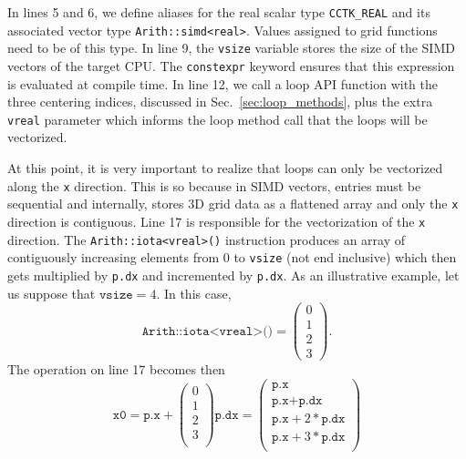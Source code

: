 In lines 5 and 6, we define aliases for the real scalar type \texttt{CCTK\_REAL} and its associated vector type \texttt{Arith::simd<real>}. Values assigned to grid functions need to be of this type. In line 9, the \texttt{vsize} variable stores the size of the SIMD vectors of the target CPU. The \texttt{constexpr} keyword ensures that this expression is evaluated at compile time. In line 12, we call a loop API function with the three centering indices, discussed in Sec.~\ref{sec:loop_methods}, plus the extra \texttt{vreal} parameter which informs the loop method call that the loops will be vectorized.

At this point, it is very important to realize that loops can only be vectorized along the \texttt{x} direction. This is so because in SIMD vectors, entries must be sequential and internally, \CarpetX stores 3D grid data as a flattened array and only the \texttt{x} direction is contiguous. Line 17 is responsible for the vectorization of the \texttt{x} direction. The \texttt{Arith::iota<vreal>()} instruction produces an array of contiguously increasing elements from 0 to \texttt{vsize} (not end inclusive) which then gets multiplied by \texttt{p.dx} and incremented by \texttt{p.dx}. As an illustrative example, let us suppose that $\texttt{vsize} = 4$. In this case, 
%
\begin{equation}
  \texttt{Arith::iota<vreal>()} = 
  \begin{pmatrix}
    0\\
    1\\
    2\\
    3
  \end{pmatrix}
  .
\end{equation}
%
The operation on line 17 becomes then
%
\begin{equation}
  \texttt{x0} = \texttt{p.x} +
  \begin{pmatrix}
    0\\
    1\\
    2\\
    3\\
  \end{pmatrix}
  \texttt{p.dx} =
  \begin{pmatrix}
    \texttt{p.x}\\
    \texttt{p.x} + \texttt{p.dx}\\
    \texttt{p.x} + 2 * \texttt{p.dx}\\
    \texttt{p.x} + 3 * \texttt{p.dx}\\
  \end{pmatrix}
\end{equation}

